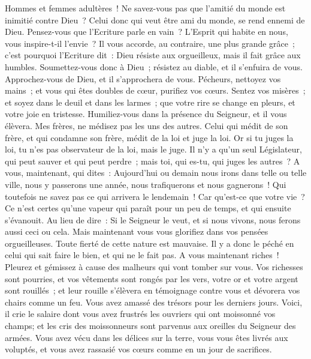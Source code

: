 \begin{multicols}{2}
Hommes et femmes adultères~! Ne savez-vous pas que l'amitié du monde est inimitié contre Dieu~? Celui donc qui veut être ami du monde, se rend ennemi de Dieu.
Pensez-vous que l'Ecriture parle en vain~? L'Esprit qui habite en nous, vous inspire-t-il l'envie~?
Il vous accorde, au contraire, une plus grande grâce~; c'est pourquoi l'Ecriture dit~: Dieu résiste aux orgueilleux, mais il fait grâce aux humbles.
Soumettez-vous donc à Dieu~; résistez au diable, et il s'enfuira de vous.
Approchez-vous de Dieu, et il s'approchera de vous. Pécheurs, nettoyez vos mains~; et vous qui êtes doubles de cœur, purifiez vos cœurs.
Sentez vos misères~; et soyez dans le deuil et dans les larmes~; que votre rire se change en pleurs, et votre joie en tristesse.
Humiliez-vous dans la présence du Seigneur, et il vous élèvera.
Mes frères, ne médisez pas les uns des autres. Celui qui médit de son frère, et qui condamne son frère, médit de la loi et juge la loi. Or si tu juges la loi, tu n'es pas observateur de la loi, mais le juge.
Il n'y a qu'un seul Législateur, qui peut sauver et qui peut perdre~; mais toi, qui es-tu, qui juges les autres~?
A vous, maintenant, qui dites~: Aujourd'hui ou demain nous irons dans telle ou telle ville, nous y passerons une année, nous trafiquerons et nous gagnerons~!
Qui toutefois ne savez pas ce qui arrivera le lendemain~! Car qu'est-ce que votre vie~? Ce n'est certes qu'une vapeur qui paraît pour un peu de temps, et qui ensuite s'évanouit.
Au lieu de dire~: Si le Seigneur le veut, et si nous vivons, nous ferons aussi ceci ou cela.
Mais maintenant vous vous glorifiez dans vos pensées orgueilleuses. Toute fierté de cette nature est mauvaise.
Il y a donc le péché en celui qui sait faire le bien, et qui ne le fait pas.
\VerseOne{}A vous maintenant riches~! Pleurez et gémissez à cause des malheurs qui vont tomber sur vous.
Vos richesses sont pourries, et vos vêtements sont rongés par les vers,
votre or et votre argent sont rouillés~; et leur rouille s'élèvera en témoignage contre vous et dévorera vos chairs comme un feu. Vous avez amassé des trésors pour les derniers jours.
Voici, il crie le salaire dont vous avez frustrés les ouvriers qui ont moissonné vos champs; et les cris des moissonneurs sont parvenus aux oreilles du Seigneur des armées.
Vous avez vécu dans les délices sur la terre, vous vous êtes livrés aux voluptés, et vous avez rassasié vos cœurs comme en un jour de sacrifices.

\end{multicols}
